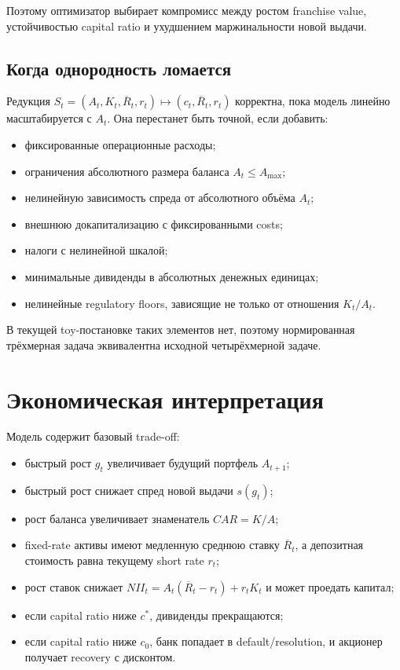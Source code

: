 \documentclass[11pt,a4paper]{article}
\newcommand{\1}{\mathbf{1}}
\begin{document}
Поэтому оптимизатор выбирает компромисс между ростом franchise value, устойчивостью capital ratio и ухудшением маржинальности новой выдачи.

\subsection{Когда однородность ломается}

Редукция $S_t=(A_t,K_t,\overline{R}_t,r_t)\mapsto(c_t,\overline{R}_t,r_t)$ корректна, пока модель линейно масштабируется с $A_t$. Она перестанет быть точной, если добавить:
\begin{itemize}[noitemsep]
    \item фиксированные операционные расходы;
    \item ограничения абсолютного размера баланса $A_t\le A_{\max}$;
    \item нелинейную зависимость спреда от абсолютного объёма $A_t$;
    \item внешнюю докапитализацию с фиксированными costs;
    \item налоги с нелинейной шкалой;
    \item минимальные дивиденды в абсолютных денежных единицах;
    \item нелинейные regulatory floors, зависящие не только от отношения $K_t/A_t$.
\end{itemize}

В текущей toy-постановке таких элементов нет, поэтому нормированная трёхмерная задача эквивалентна исходной четырёхмерной задаче.

\section{Экономическая интерпретация}

Модель содержит базовый trade-off:
\begin{itemize}
    \item быстрый рост $g_t$ увеличивает будущий портфель $A_{t+1}$;
    \item быстрый рост снижает спред новой выдачи $s(g_t)$;
    \item рост баланса увеличивает знаменатель $CAR=K/A$;
    \item fixed-rate активы имеют медленную среднюю ставку $\overline{R}_t$, а депозитная стоимость равна текущему short rate $r_t$;
    \item рост ставок снижает $NII_t=A_t(\overline{R}_t-r_t)+r_tK_t$ и может проедать капитал;
    \item если capital ratio ниже $c^*$, дивиденды прекращаются;
    \item если capital ratio ниже $c_0$, банк попадает в default/resolution, и акционер получает recovery с дисконтом.
\end{itemize}
\end{document}
